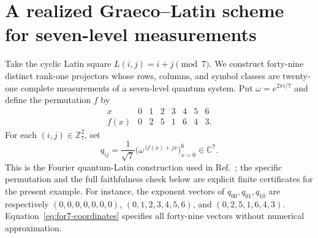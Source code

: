 \documentclass[aps,pra,reprint,superscriptaddress,longbibliography,nofootinbib,floatfix,10pt]{revtex4-2}
\theoremstyle{definition}\newtheorem{definition}[theorem]{Definition}
\theoremstyle{remark}\newtheorem{remark}[theorem]{Remark}
\begin{document}
\section{A realized Graeco--Latin scheme for seven-level measurements}\label{sec:latin-for}

Take the cyclic Latin square $L(i,j)=i+j\pmod7$. We construct forty-nine distinct rank-one projectors whose rows, columns, and symbol classes are twenty-one complete measurements of a seven-level quantum system. Put $\omega=e^{2\pi i/7}$ and define the permutation $f$ by
\begin{equation}\label{eq:for7-permutation}
\begin{array}{c|rrrrrrr}
x&0&1&2&3&4&5&6\\\hline
f(x)&0&2&5&1&6&4&3.
\end{array}
\end{equation}
For each $(i,j)\in\mathbb Z_7^2$, set
\begin{equation}\label{eq:for7-coordinates}
q_{ij}=\frac1{\sqrt7}\bigl(\omega^{\,i f(x)+j x}\bigr)_{x=0}^{6}\in\mathbb C^7.
\end{equation}
This is the Fourier quantum-Latin construction used in Ref.~\cite{ball2026large}; the specific permutation and the full faithfulness check below are explicit finite certificates for the present example. For instance, the exponent vectors of $q_{00},q_{01},q_{10}$ are respectively $(0,0,0,0,0,0,0)$, $(0,1,2,3,4,5,6)$, and $(0,2,5,1,6,4,3)$. Equation~\eqref{eq:for7-coordinates} specifies all forty-nine vectors without numerical approximation.
\end{document}
